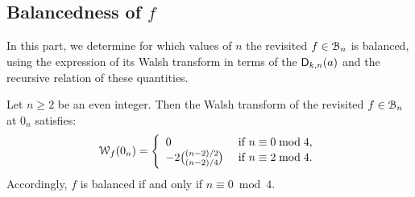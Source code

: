 \documentclass{llncs}
\begin{document}
\subsection{Balancedness of $f$}\label{sec:balancedness}

In this part, we determine for which values of $n$ the revisited \hwbf{} $f\in\BN$ is balanced, using the expression of its Walsh transform in terms of the $\Dnka{n}{k}{a}$ and the recursive relation of these quantities.

\begin{theorem}\label{th:bal}
	Let $n\geq 2$ be an even integer.
	Then the Walsh transform of the revisited \hwbf{} $f\in\BN$ at $0_n$ satisfies:
	\[
		\wt{f}(0_n)=\left\{\begin{array}{ll}
			0&\text{ if }n\equiv 0\bmod 4,\\
			-2\binom{(n-2)/2}{(n-2)/4}&\text{ if }n\equiv 2\bmod 4.\\
		\end{array}\right.
	\]
	Accordingly, $f$ is balanced if and only if $n \equiv 0\bmod 4$.
\end{theorem}
\end{document}
